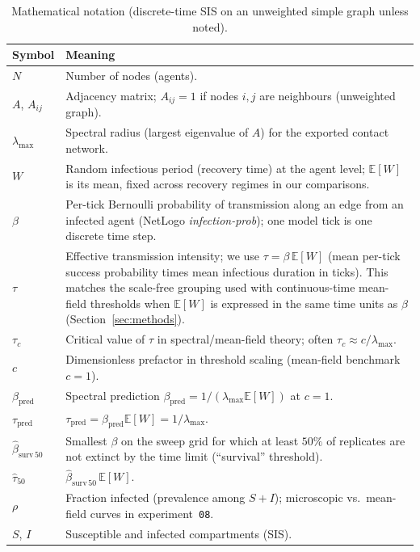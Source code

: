 \documentclass[11pt,a4paper]{article}
\begin{document}
\begin{table}[H]
  \centering
  \small
  \caption{Mathematical notation (discrete-time SIS on an unweighted simple graph unless noted).}
  \label{tab:notation}
  \begin{tabularx}{\linewidth}{@{}l X@{}}
    \toprule
    \textbf{Symbol} & \textbf{Meaning} \\
    \midrule
    $N$ & Number of nodes (agents). \\
    $A$, $A_{ij}$ & Adjacency matrix; $A_{ij}{=}1$ if nodes $i,j$ are neighbours (unweighted graph). \\
    $\lambda_{\max}$ & Spectral radius (largest eigenvalue of $A$) for the exported contact network. \\
    $W$ & Random infectious period (recovery time) at the agent level; $\mathbb{E}[W]$ is its mean, fixed across recovery regimes in our comparisons. \\
    $\beta$ & Per-tick Bernoulli probability of transmission along an edge from an infected agent (NetLogo \emph{infection-prob}); one model tick is one discrete time step. \\
    $\tau$ & Effective transmission intensity; we use $\tau=\beta\,\mathbb{E}[W]$ (mean per-tick success probability times mean infectious duration in ticks). This matches the scale-free grouping used with continuous-time mean-field thresholds when $\mathbb{E}[W]$ is expressed in the same time units as $\beta$ (Section~\ref{sec:methods}). \\
    $\tau_c$ & Critical value of $\tau$ in spectral/mean-field theory; often $\tau_c\approx c/\lambda_{\max}$. \\
    $c$ & Dimensionless prefactor in threshold scaling (mean-field benchmark $c{=}1$). \\
    $\beta_{\mathrm{pred}}$ & Spectral prediction $\beta_{\mathrm{pred}}=1/(\lambda_{\max}\mathbb{E}[W])$ at $c{=}1$. \\
    $\tau_{\mathrm{pred}}$ & $\tau_{\mathrm{pred}}=\beta_{\mathrm{pred}}\mathbb{E}[W]=1/\lambda_{\max}$. \\
    $\hat{\beta}_{\mathrm{surv}\,50}$ & Smallest $\beta$ on the sweep grid for which at least $50\%$ of replicates are not extinct by the time limit (``survival'' threshold). \\
    $\hat{\tau}_{50}$ & $\hat{\beta}_{\mathrm{surv}\,50}\,\mathbb{E}[W]$. \\
    $\rho$ & Fraction infected (prevalence among $S{+}I$); microscopic vs.\ mean-field curves in experiment~\texttt{08}. \\
    $S$, $I$ & Susceptible and infected compartments (SIS). \\
    \bottomrule
  \end{tabularx}
\end{table}
\end{document}
